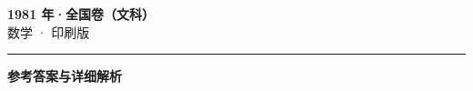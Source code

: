 \documentclass[zihao=5, a4paper]{ctexart}
\begin{document}
\begin{center}
  {\Large\bfseries 1981 年·全国卷（文科）}\\[4pt]
  {\large 数学 · 印刷版}
\end{center}
\medskip
{}

\par\bigskip\hrule\bigskip
{}
\begin{center}{\large\bfseries 参考答案与详细解析}\end{center}
\smallskip

\end{document}
